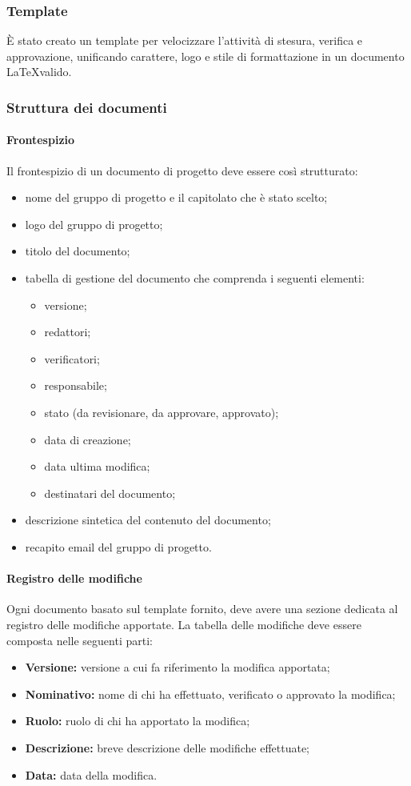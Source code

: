   \subsubsection{Template}
  \`E stato creato un template per velocizzare l'attività di stesura, verifica e
  approvazione, unificando carattere, logo e stile di formattazione
  in un documento \LaTeX \space valido.

  \subsubsection{Struttura dei documenti}
  \paragraph{Frontespizio}
  Il frontespizio di un documento di progetto deve essere così strutturato:
  \begin{itemize}
    \item nome del gruppo di progetto e il capitolato che è stato scelto;
    \item logo del gruppo di progetto;
    \item titolo del documento;
    \item tabella di gestione del documento che comprenda i seguenti elementi:
    \begin{itemize}
      \item versione;
      \item redattori;
      \item verificatori;
      \item responsabile;
      \item stato (da revisionare, da approvare, approvato);
      \item data di creazione;
      \item data ultima modifica;
      \item destinatari del documento;
    \end{itemize}
    \item descrizione sintetica del contenuto del documento;
    \item recapito email del gruppo di progetto.
  \end{itemize}
  \paragraph{Registro delle modifiche}
  Ogni documento basato sul template fornito, deve avere una sezione dedicata al registro delle modifiche apportate.
  La tabella delle modifiche deve essere composta nelle seguenti parti:
  \begin{itemize}
    \item \textbf{Versione:} versione a cui fa riferimento la modifica apportata;
    \item \textbf{Nominativo:} nome di chi ha effettuato, verificato o approvato la modifica;
    \item \textbf{Ruolo:} ruolo di chi ha apportato la modifica;
    \item \textbf{Descrizione:} breve descrizione delle modifiche effettuate;
    \item \textbf{Data:} data della modifica.
  \end{itemize}
